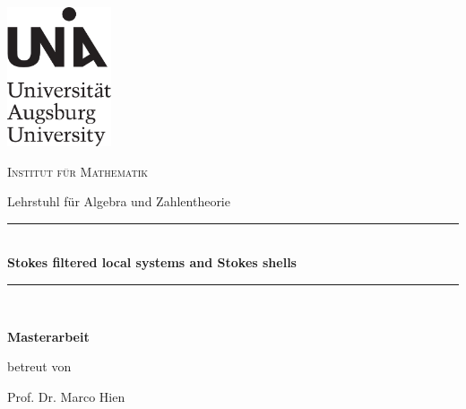 \thispagestyle{empty}

\begin{center}
		\includegraphics[width = 0.23\textwidth]{images/Uni_Aug_Logo_Basis_pos_A.pdf}
        \vspace{0.5cm}
        
		\Large{\textsc{Institut für Mathematik}}
  
  Lehrstuhl für Algebra und Zahlentheorie
		\vspace{0.5cm}
		
\rule{\textwidth}{1.5pt} \\[4mm]
\textbf{\Huge{ Stokes filtered local systems and \linespread{1.5}Stokes shells}}\\
\rule{\textwidth}{1.5pt} \\
\vspace{2cm}		
			
\textbf{Masterarbeit}\\
\vspace{1cm}
		\theauthor
		\vspace{2cm}
		
		betreut von\par
		Prof. Dr. Marco Hien
		\vspace{1.5cm}
		
		
		{\large \thedate\par}
\end{center}